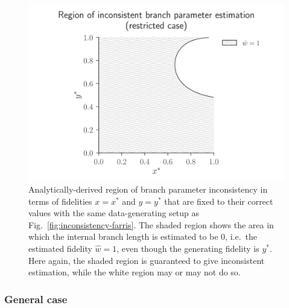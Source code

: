 \documentclass{article}
\begin{document}
\begin{figure}
\centering
\includegraphics[width=\textwidth]{branch-length-inconsistency-inkscape}
\caption{Analytically-derived region of branch parameter inconsistency in terms of fidelities $x=x^*$ and $y=y^*$ that are fixed to their correct values with the same data-generating setup as Fig.~\ref{fig:inconsistency-farris}.
The shaded region shows the area in which the internal branch length is estimated to be 0, i.e.\ the estimated fidelity $\hat{w} = 1$, even though the generating fidelity is $y^*$.
Here again, the shaded region is guaranteed to give inconsistent estimation, while the white region may or may not do so.}
\label{fig:bl-inconsistency}
\end{figure}

\subsubsection*{General case}
\end{document}
